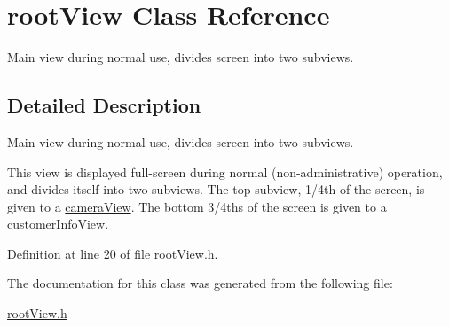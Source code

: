 \hypertarget{interfaceroot_view}{
\section{rootView Class Reference}
\label{interfaceroot_view}
}


Main view during normal use, divides screen into two subviews.  




\subsection{Detailed Description}
Main view during normal use, divides screen into two subviews. 

This view is displayed full-\/screen during normal (non-\/administrative) operation, and divides itself into two subviews. The top subview, 1/4th of the screen, is given to a \hyperlink{interfacecamera_view}{cameraView}. The bottom 3/4ths of the screen is given to a \hyperlink{interfacecustomer_info_view}{customerInfoView}. 

Definition at line 20 of file rootView.h.



The documentation for this class was generated from the following file:\begin{DoxyCompactItemize}
\item 
\hyperlink{root_view_8h}{rootView.h}\end{DoxyCompactItemize}
